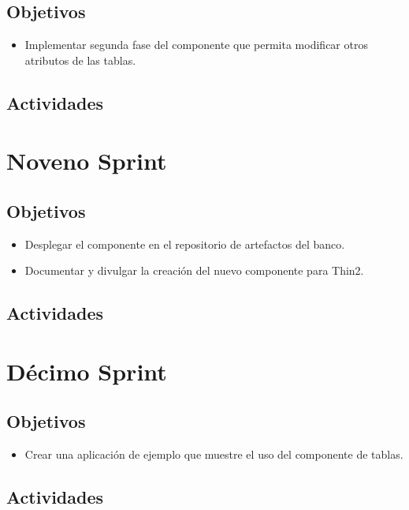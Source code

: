 \subsection{Objetivos}
\begin{itemize}
  \item Implementar segunda fase del componente que permita modificar otros atributos de las tablas.
\end{itemize}
\subsection{Actividades}

\section{Noveno Sprint}

\subsection{Objetivos}
\begin{itemize}
  \item Desplegar el componente en el repositorio de artefactos del banco.
  \item Documentar y divulgar la creación del nuevo componente para Thin2.
\end{itemize}
\subsection{Actividades}

\section{Décimo Sprint}

\subsection{Objetivos}
\begin{itemize}
  \item Crear una aplicación de ejemplo que muestre el uso del componente de tablas.
\end{itemize}
\subsection{Actividades}
